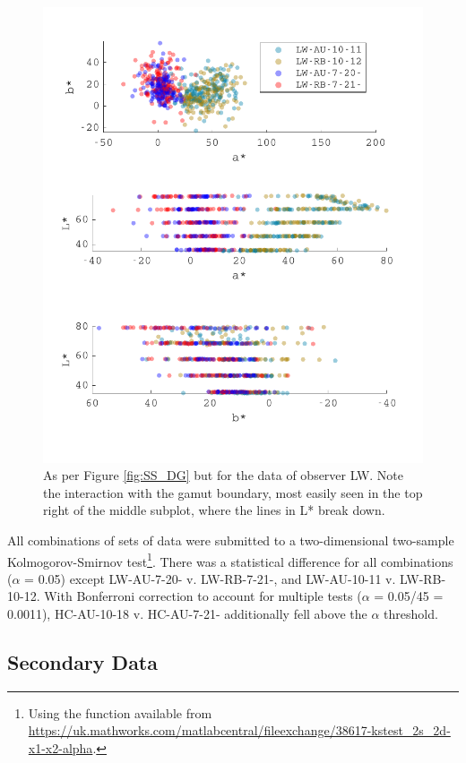 \begin{figure}[htbp]
\includegraphics[max width=1.2\textwidth,center]{figs/SmallSphere/LW.pdf}
\caption{As per Figure \ref{fig:SS_DG} but for the data of observer LW. Note the interaction with the gamut boundary, most easily seen in the top right of the middle subplot, where the lines in L* break down.}
\label{fig:SS_LW}
\end{figure} 

All combinations of sets of data were submitted to a two-dimensional two-sample Kolmogorov-Smirnov test\footnote{Using the function available from \url{https://uk.mathworks.com/matlabcentral/fileexchange/38617-kstest_2s_2d-x1-x2-alpha}.}. There was a statistical difference for all combinations ($\alpha$ = 0.05) except LW-AU-7-20- v. LW-RB-7-21-, and LW-AU-10-11 v. LW-RB-10-12. With Bonferroni correction to account for multiple tests ($\alpha$ = 0.05/45 = 0.0011), HC-AU-10-18 v. HC-AU-7-21- additionally fell above the $\alpha$ threshold.

\clearpage

\subsection{Secondary Data}


